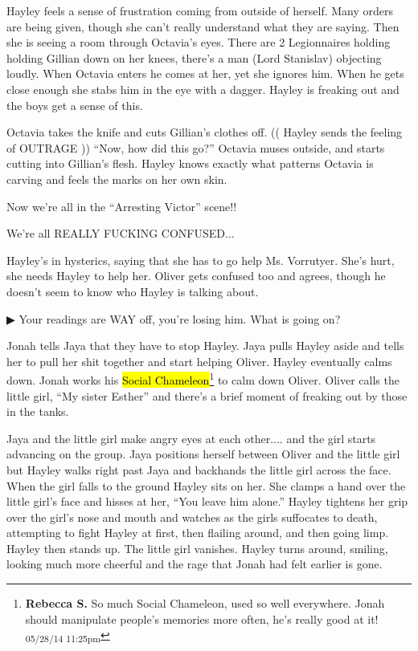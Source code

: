 Hayley feels a sense of frustration coming from outside of herself.  Many orders are being given, though she can't really understand what they are saying.   Then she is seeing a room through Octavia's eyes.  There are 2 Legionnaires holding holding Gillian down on her knees, there's a man (Lord Stanislav) objecting loudly.  When Octavia enters he comes at her, yet she ignores him.  When he gets close enough she stabs him in the eye with a dagger.   Hayley is freaking out and the boys get a sense of this.  

Octavia takes the knife and cuts Gillian's clothes off.  (( Hayley sends the feeling of OUTRAGE )) ``Now, how did this go?''  Octavia muses outside, and starts cutting into Gillian's flesh.  Hayley knows exactly what patterns Octavia is carving and feels the marks on her own skin.




Now we're all in the ``Arresting Victor'' scene!!



We're all REALLY FUCKING CONFUSED... 



Hayley's in hysterics, saying that she has to go help Ms. Vorrutyer.  She's hurt, she needs Hayley to help her.  Oliver gets confused too and agrees, though he doesn't seem to know who Hayley is talking about.



 {\color[RGB]{68,68,68}▶ } Your readings are WAY off, you're losing him.  What is going on?



Jonah tells Jaya that they have to stop Hayley.  Jaya pulls Hayley aside and tells her to pull her shit together and start helping Oliver.  Hayley eventually calms down.  Jonah works his \hl{Social Chameleon}\footnote{\textbf{Rebecca S. }So much Social Chameleon, used so well everywhere.  Jonah should manipulate people's memories more often, he's really good at it! \textsubscript{05/28/14 11:25pm}} to calm down Oliver.  Oliver calls the little girl, ``My sister Esther'' and there's a brief moment of freaking out by those in the tanks. 



Jaya and the little girl make angry eyes at each other.... and the girl starts advancing on the group.  Jaya positions herself between Oliver and the little girl but Hayley walks right past Jaya and backhands the little girl across the face.  When the girl falls to the ground Hayley sits on her.  She clamps a hand over the little girl's face and hisses at her, ``You leave him alone.''  Hayley tightens her grip over the girl's nose and mouth and watches as the girls suffocates to death, attempting to fight Hayley at first, then flailing around, and then going limp.  Hayley then stands up.  The little girl vanishes. Hayley turns around, smiling, looking much more cheerful and the rage that Jonah had felt earlier is gone.



